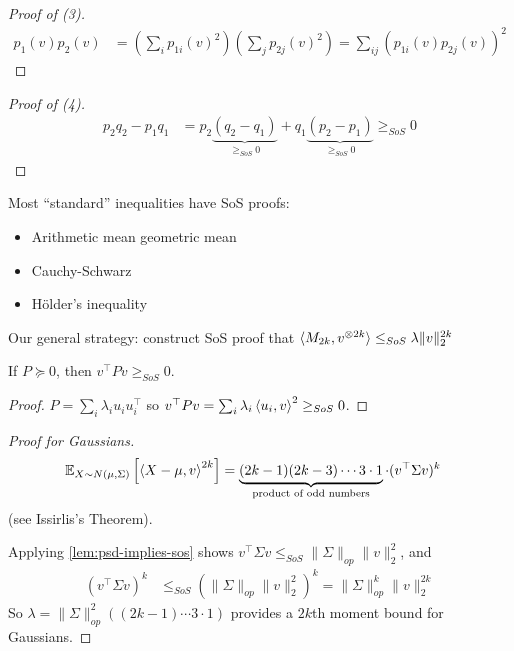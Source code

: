 \begin{proof}[Proof of (3)]
  \begin{align}
    p_1(v) p_2(v)
    &= \left( \sum_i p_{1i}(v)^2\right) \left( \sum_j p_{2j}(v)^2 \right)
    = \sum_{ij} (p_{1i}(v) p_{2j}(v))^2
  \end{align}
\end{proof}

\begin{proof}[Proof of (4)]
  \begin{align}
    p_2 q_2 - p_1 q_1
    &= p_2 \underbrace{(q_2 - q_1)}_{\geq_{SoS} 0}
    + q_1 \underbrace{(p_2 - p_1)}_{\geq_{SoS} 0}
    \geq_{SoS} 0
  \end{align}
\end{proof}

\begin{remark}
  Most ``standard'' inequalities have SoS proofs:
  \begin{itemize}
    \item Arithmetic mean geometric mean
    \item Cauchy-Schwarz
    \item H\"older's inequality
  \end{itemize}
\end{remark}

Our general strategy: construct SoS proof that
$\braket{M_{2k}, v^{\otimes 2k}} \leq_{SoS} \lambda \|v\|_2^{2k}$


\begin{lemma}\label{lem:psd-implies-sos}
  If $P \succeq 0$, then $v^\top P v \geq_{SoS} 0$.
\end{lemma}
\begin{proof}
  $P = \sum_i \lambda_i u_i u_i^\top$ so $v^\top P v = \sum_i \lambda_i \braket{u_i, v}^2 \geq_{SoS} 0$.
\end{proof}

\begin{proof}[Proof for Gaussians]
  \begin{align}
    \mathbb{E}_{X \sim N(\mu,\Sigma)}\left[
      \braket{X - \mu, v}^{2k}
    \right]
    &= \underbrace{(2k-1)(2k-3)\cdots 3  \cdot 1}_{\text{product of odd numbers}} \cdot (v^\top \Sigma v)^k
  \end{align}
  (see Issirlis's Theorem).

  Applying \cref{lem:psd-implies-sos} shows $v^\top \Sigma v \leq_{SoS} \|\Sigma\|_{op} \|v\|_2^2$, and
  \begin{align}
    (v^\top \Sigma v)^{k}
    &\leq_{SoS} (\|\Sigma\|_{op} \|v\|_2^2)^k
    = \|\Sigma\|_{op}^k \|v\|_2^{2k}
  \end{align}
  So $\lambda = \|\Sigma\|_{op}^2 ((2k-1)\cdots3\cdot1)$
  provides a $2k$th moment bound for Gaussians.
\end{proof}

